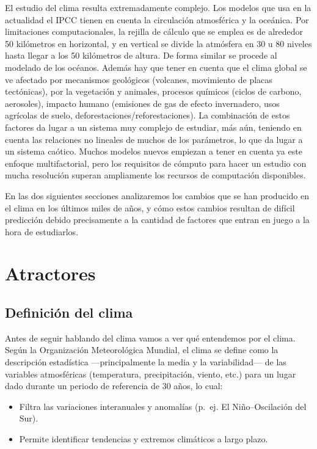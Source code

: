 \documentclass[
  10pt,
  a4paper,
  DIV=11,
  numbers=noendperiod,
  open=any]{scrreprt}
\numberwithin{equation}{chapter}
\numberwithin{equation}{section}
\renewcommand{\[}{\begin{equation}}
\renewcommand{\]}{\end{equation}}
\begin{document}
El estudio del clima resulta extremadamente complejo. Los modelos que
usa en la actualidad el IPCC tienen en cuenta la circulación atmosférica
y la oceánica. Por limitaciones computacionales, la rejilla de cálculo
que se emplea es de alrededor 50 kilómetros en horizontal, y en vertical
se divide la atmósfera en 30 u 80 niveles hasta llegar a los 50
kilómetros de altura. De forma similar se procede al modelado de los
océanos. Además hay que tener en cuenta que el clima global se ve
afectado por mecanismos geológicos (volcanes, movimiento de placas
tectónicas), por la vegetación y animales, procesos químicos (ciclos de
carbono, aerosoles), impacto humano (emisiones de gas de efecto
invernadero, usos agrícolas de suelo, deforestaciones/reforestaciones).
La combinación de estos factores da lugar a un sistema muy complejo de
estudiar, más aún, teniendo en cuenta las relaciones no lineales de
muchos de los parámetros, lo que da lugar a un sistema caótico. Muchos
modelos nuevos empiezan a tener en cuenta ya este enfoque
multifactorial, pero los requisitos de cómputo para hacer un estudio con
mucha resolución superan ampliamente los recursos de computación
disponibles.

En las dos siguientes secciones analizaremos los cambios que se han
producido en el clima en los últimos miles de años, y cómo estos cambios
resultan de difícil predicción debido precisamente a la cantidad de
factores que entran en juego a la hora de estudiarlos.

\chapter{Atractores}\label{atractores}

\section{Definición del clima}\label{definiciuxf3n-del-clima}

Antes de seguir hablando del clima vamos a ver qué entendemos por el
clima. Según la Organización Meteorológica Mundial, el clima se define
como la descripción estadística ---principalmente la media y la
variabilidad--- de las variables atmosféricas (temperatura,
precipitación, viento, etc.) para un lugar dado durante un periodo de
referencia de 30 años, lo cual:

\begin{itemize}
\item
  Filtra las variaciones interanuales y anomalías (p.~ej. El
  Niño--Oscilación del Sur).
\item
  Permite identificar tendencias y extremos climáticos a largo plazo.
\end{itemize}
\end{document}
